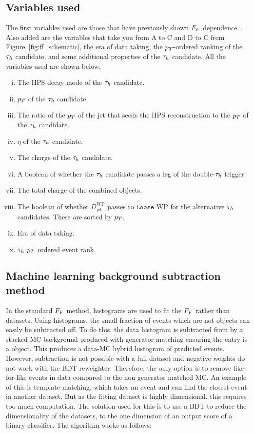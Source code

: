 \subsection{Variables used}

The first variables used are those that have previously shown $F_{F}$ dependence~\cite{CMS:2020rpr,CMS:2022rbd}.
Also added are the variables that take you from A to C and D to C from Figure~\ref{fig:ff_schematic}, the era of data taking, the $p_{T}$-ordered ranking of the $\tau_{h}$ candidate, and some additional properties of the $\tau_{h}$ candidate. 
All the variables used are shown below.

\begin{enumerate}[i)]
\item The \ac{HPS} decay mode of the $\tau_{h}$ candidate.
\item $p_{T}$ of the $\tau_{h}$ candidate.
\item The ratio of the $p_{T}$ of the jet that seeds the \ac{HPS} reconstruction to the $p_{T}$ of the $\tau_{h}$ candidate.
\item $\eta$ of the $\tau_{h}$ candidate.
\item The charge of the $\tau_{h}$ candidate.
\item A boolean of whether the $\tau_{h}$ candidate passes a leg of the double-$\tau_{h}$ trigger.
\item The total charge of the combined objects.
\item The boolean of whether $D_{\text{jet}}^{\text{WP}}$ passes to $\texttt{Loose}$ WP for the alternative $\tau_{h}$ candidates. These are sorted by $p_{T}$.
\item Era of data taking.
\item $\tau_{h}$ $p_{T}$ ordered event rank.
\end{enumerate}

\subsection{Machine learning background subtraction method}

In the standard $F_{F}$ method, histograms are used to fit the $F_{F}$ rather than datasets. 
Using histograms, the small fraction of events which are not \jtth objects can easily be subtracted off. 
To do this, the data histogram is subtracted from by a stacked \ac{MC} background produced with generator matching ensuring the entry is a \jtth object. 
This produces a data-\ac{MC} hybrid histogram of predicted \jtth events.
However, subtraction is not possible with a full dataset and negative weights do not work with the \ac{BDT} reweighter. 
Therefore, the only option is to remove like-for-like events in data compared to the non \jtth generator matched \ac{MC}.
An example of this is template matching, which takes an event and can find the closest event in another dataset.
But as the fitting dataset is highly dimensional, this requires too much computation.
The solution used for this is to use a \ac{BDT} to reduce the dimensionality of the datasets, to the one dimension of an output score of a binary classifier.
The algorithm works as follows:


